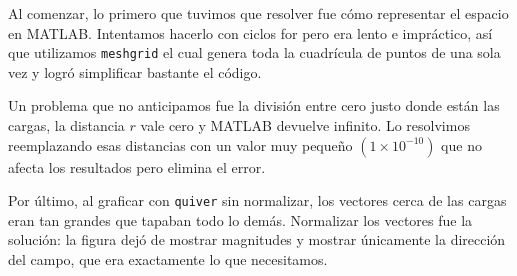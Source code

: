 Al comenzar, lo primero que tuvimos que resolver fue cómo representar el espacio en MATLAB. Intentamos hacerlo con ciclos for pero era lento e impráctico, así que utilizamos \verb|meshgrid| el cual genera toda la cuadrícula de puntos de una sola vez y logró simplificar bastante el código.

Un problema que no anticipamos fue la división entre cero justo donde están las cargas, la distancia $r$ vale cero y MATLAB devuelve infinito. Lo resolvimos reemplazando esas distancias con un valor muy pequeño $(1\times10^{-10})$ que no afecta los resultados pero elimina el error.

Por último, al graficar con \verb|quiver| sin normalizar, los vectores cerca de las cargas eran tan grandes que tapaban todo lo demás. Normalizar los vectores fue la solución: la figura dejó de mostrar magnitudes y mostrar únicamente la dirección del campo, que era exactamente lo que necesitamos.  
